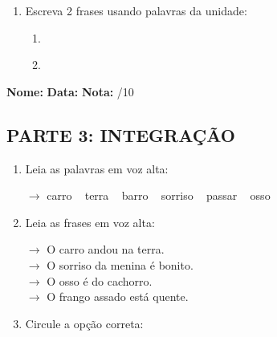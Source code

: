 \begin{exercicio}
\begin{enumerate}[resume]
  \item Escreva 2 frases usando palavras da unidade:
  \begin{enumerate}[label=\alph*)]
    \item \underline{\hspace{8cm}}
    \item \underline{\hspace{8cm}}
  \end{enumerate}

\end{enumerate}

\end{exercicio}



\begin{exercicio}

\noindent\textbf{Nome:} \underline{\hspace{3.2cm}} \quad \textbf{Data:} \underline{\hspace{1.6cm}} \quad \textbf{Nota:} \underline{\hspace{0.9cm}}/10


\subsection*{PARTE 3: INTEGRAÇÃO}

\begin{enumerate}[resume]

  \item Leia as palavras em voz alta:
  \begin{center}
  $\rightarrow$ carro ~ terra ~ barro ~ sorriso ~ passar ~ osso
  \end{center}

  \item Leia as frases em voz alta:
  \begin{center}
  $\rightarrow$ O carro andou na terra.\\
  $\rightarrow$ O sorriso da menina é bonito.\\
  $\rightarrow$ O osso é do cachorro.\\
  $\rightarrow$ O frango assado está quente.\\
  \end{center}

  \item Circule a opção correta:
  \begin{enumerate}[label=(\alph*)]


\end{enumerate}
\end{enumerate}
\end{exercicio}
